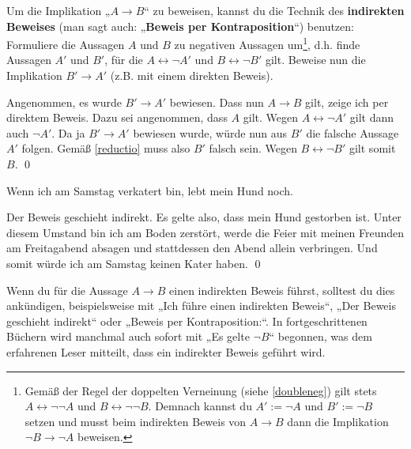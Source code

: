\begin{sat} \label{indirekterbeweis}
  Um die Implikation „$A\to B$“ zu beweisen, kannst du die Technik des \textbf{indirekten Beweises} (man sagt auch: „\textbf{Beweis per Kontraposition}“) benutzen: \\
 Formuliere die Aussagen $A$ und $B$ zu negativen Aussagen um\footnote{Gemäß der Regel der doppelten Verneinung (siehe \cref{doubleneg}) gilt stets $A\leftrightarrow \neg\neg A$ und $B\leftrightarrow \neg\neg B$. Demnach kannst du $A':=\neg A$ und $B':=\neg B$ setzen und musst beim indirekten Beweis von $A\to B$ dann die Implikation $\neg B\to \neg A$ beweisen.}, d.h. finde Aussagen $A'$ und $B'$, für die $A\leftrightarrow \neg A'$ und $B\leftrightarrow \neg B'$ gilt. Beweise nun die Implikation $B'\to A'$ (z.B. mit einem direkten Beweis).%
\end{sat}
\begin{bew}
Angenommen, es wurde $B'\to A'$ bewiesen. Dass nun $A\to B$ gilt, zeige ich per direktem Beweis. Dazu sei angenommen, dass $A$ gilt. Wegen $A\leftrightarrow \neg A'$ gilt dann auch $\neg A'$. Da ja $B'\to A'$ bewiesen wurde, würde nun aus $B'$ die falsche Aussage $A'$ folgen. Gemäß \cref{reductio} muss also $B'$ falsch sein. Wegen $B\leftrightarrow \neg B'$ gilt somit $B$. \qed
\end{bew}



\begin{bsp}
Wenn ich am Samstag verkatert bin, lebt mein Hund noch.
\end{bsp}
\begin{bew}
 Der Beweis geschieht indirekt. Es gelte also, dass mein Hund gestorben ist. Unter diesem Umstand bin ich am Boden zerstört, werde die Feier mit meinen Freunden am Freitagabend absagen und stattdessen den Abend allein verbringen. Und somit würde ich am Samstag keinen Kater haben. \qed
\end{bew}




  
  
\begin{bem}[Signalwörter]
Wenn du für die Aussage $A\to B$ einen indirekten Beweis führst, solltest du dies ankündigen, beispielsweise mit „Ich führe einen indirekten Beweis“, „Der Beweis geschieht indirekt“ oder „Beweis per Kontraposition:“. In fortgeschrittenen Büchern wird manchmal auch sofort mit „Es gelte $\neg B$“ begonnen, was dem erfahrenen Leser mitteilt, dass ein indirekter Beweis geführt wird.
\end{bem}
  


